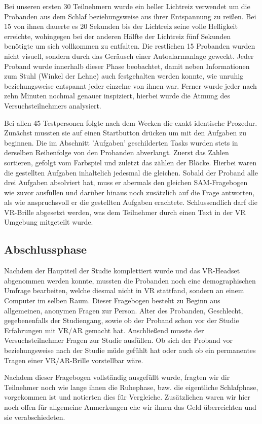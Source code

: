 Bei unseren ersten 30 Teilnehmern wurde ein heller Lichtreiz verwendet um die Probanden aus dem Schlaf beziehungsweise aus ihrer Entspannung zu reißen. Bei 15 von ihnen dauerte es 20 Sekunden bis der Lichtreiz seine volle Helligkeit erreichte, wohingegen bei der anderen Hälfte der Lichtreiz fünf Sekunden benötigte um sich vollkommen zu entfalten. Die restlichen 15 Probanden wurden nicht visuell, sondern durch das Geräusch einer Autoalarmanlage geweckt. Jeder Proband wurde innerhalb dieser Phase beobachtet, damit neben Informationen zum Stuhl (Winkel der Lehne) auch festgehalten werden konnte, wie unruhig beziehungsweise entspannt jeder einzelne von ihnen war. Ferner wurde jeder nach zehn Minuten nochmal genauer inspiziert, hierbei wurde die Atmung des Versuchsteilnehmers analysiert.

Bei allen 45 Testpersonen folgte nach dem Wecken die exakt identische Prozedur. Zunächst mussten sie auf einen Startbutton drücken um mit den Aufgaben zu beginnen. Die im Abschnitt 'Aufgaben' geschilderten Tasks wurden stets in derselben Reihenfolge von den Probanden abverlangt. Zuerst das Zahlen sortieren, gefolgt vom Farbspiel und zuletzt das zählen der Blöcke. Hierbei waren die gestellten Aufgaben inhaltelich jedesmal die gleichen. %
Sobald der Proband alle drei Aufgaben absolviert hat, muss er abermals den gleichen SAM-Fragebogen wie zuvor ausfüllen und darüber hinaus noch zusätzlich auf die Frage antworten, als wie anspruchsvoll er die gestellten Aufgaben erachtete. Schlussendlich darf die VR-Brille abgesetzt werden, was dem Teilnehmer durch einen Text in der VR Umgebung mitgeteilt wurde.

\subsection{Abschlussphase}
Nachdem der Hauptteil der Studie komplettiert wurde und das VR-Headset abgenommen werden konnte, mussten die Probanden noch eine demographischen Umfrage bearbeiten, welche diesmal nicht in VR stattfand, sondern an einem Computer im selben Raum. Dieser Fragebogen besteht zu Beginn aus allgemeinen, anonymen Fragen zur Person. Alter des Probanden, Geschlecht, gegebenenfalls der Studiengang, sowie ob der Proband schon vor der Studie Erfahrungen mit VR/AR gemacht hat. Anschließend musste der Versuchsteilnehmer Fragen zur Studie ausfüllen. Ob sich der Proband vor beziehungsweise nach der Studie müde gefühlt hat oder auch ob ein permanentes Tragen einer VR/AR-Brille vorstellbar wäre.    

Nachdem dieser Fragebogen vollständig ausgefüllt wurde, fragten wir dir Teilnehmer noch wie lange ihnen die Ruhephase, bzw. die eigentliche Schlafphase, vorgekommen ist und notierten dies für Vergleiche. Zusätzlichen waren wir hier noch offen für allgemeine Anmerkungen ehe wir ihnen das Geld überreichten und sie verabschiedeten.
